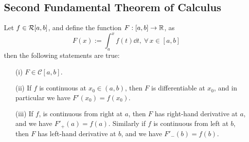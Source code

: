 \subsection{Second Fundamental Theorem of Calculus}

\begin{thm}\label{thm2:feb14}
    Let $f \in \mathcal{R}[a,b]$, and define the function $F : [a,b] \to \mathbb{R}$, as 
    \begin{equation}\label{eq2:feb14}
        F(x) := \int_a^x f(t) \dd{t}, \ \forall \, x \in [a,b]
    \end{equation}
    then the following statements are true:
    \begin{enumerate}
        \item[(i)] $F \in \mathcal{C}[a,b]$.
        \item[(ii)] If $f$ is continuous at $x_0 \in (a,b)$, then $F$ is differentiable at $x_0$, and in particular we have $F'(x_0) = f(x_0)$.
        \item[(iii)] If $f$, is continuous from right at $a$, then $F$ has right-hand derivative at $a$, and we have $F'_{+}(a) = f(a)$. Similarly if $f$ is continuous from left at $b$, then $F$ has left-hand derivative at $b$, and we have $F'_{-}(b) = f(b)$. 
    \end{enumerate}
\end{thm}

